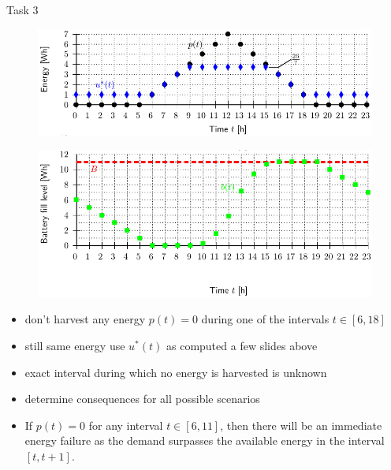 \begin{frame}[allowframebreaks]{Task 3}{}
\begin{solutionnoinc}
    \begin{figure}
      \centering
      \includegraphics[width=\textwidth]{./figures/task3_use_and_harvest.png}
    \end{figure}
  \end{solutionnoinc}
  \begin{solution}
    \begin{figure}
      \centering
      \includegraphics[width=\textwidth]{./figures/task3_battery.png}
    \end{figure}
  \end{solution}
  \framebreak
  \begin{tasknoinc}
    \begin{itemize}
      \item don't harvest any energy $p(t) = 0$ during one of the intervals $t\in[6, 18]$
      \item still same energy use $u^*(t)$ as computed a few slides above
      \item exact interval during which no energy is harvested is unknown
      \item determine consequences for all possible scenarios
    \end{itemize}
  \end{tasknoinc}
  \framebreak
  \begin{solution}
    \begin{itemize}
       \item If $p(t)=0$ for any interval $t \in[6,11]$, then there will be an immediate energy failure as the demand surpasses the available energy in the interval $[t, t+1]$.

\end{itemize}
\end{solution}
\end{frame}
